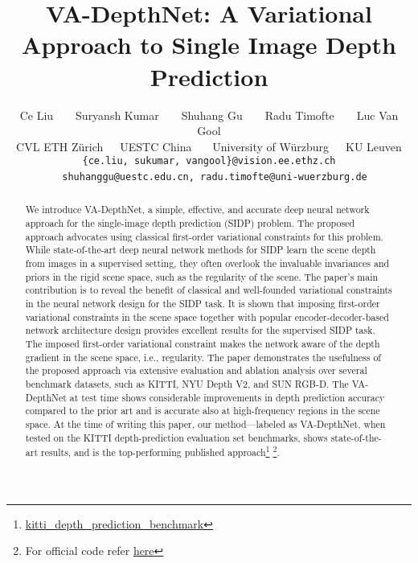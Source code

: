 \documentclass{article} \usepackage{iclr2023_conference, times}
\title{VA-DepthNet: A Variational Approach to Single Image Depth Prediction}
\author{Ce Liu~~~~Suryansh Kumar~~~~Shuhang Gu~~~~Radu Timofte~~~~Luc Van Gool \\ 
CVL ETH Z\"urich~~~UESTC China ~~~University of W\"urzburg~~~KU Leuven\\
\texttt{\{ce.liu, sukumar, vangool\}@vision.ee.ethz.ch}\\ ~~\texttt{shuhanggu@uestc.edu.cn, radu.timofte@uni-wuerzburg.de}
}
\begin{document}
\maketitle






\begin{abstract}
We introduce VA-DepthNet, a simple, effective, and accurate deep neural network approach for the single-image depth prediction (SIDP) problem. The proposed approach advocates using classical first-order variational constraints for this problem. While state-of-the-art deep neural network methods for SIDP learn the scene depth from images in a supervised setting, they often overlook the invaluable invariances and priors in the rigid scene space, such as the regularity of the scene. The paper's main contribution is to reveal the benefit of classical and well-founded variational constraints in the neural network design for the SIDP task. It is shown that imposing first-order variational constraints in the scene space together with popular encoder-decoder-based network architecture design provides excellent results for the supervised SIDP task. The imposed first-order variational constraint makes the network aware of the depth gradient in the scene space, i.e., regularity. The paper demonstrates the usefulness of the proposed approach via extensive evaluation and ablation analysis over several benchmark datasets, such as KITTI, NYU Depth V2, and SUN RGB-D. The VA-DepthNet at test time shows considerable improvements in depth prediction accuracy compared to the prior art and is accurate also at high-frequency regions in the scene space.  At the time of writing this paper, our method---labeled as VA-DepthNet, when tested on the KITTI depth-prediction evaluation set benchmarks, shows state-of-the-art results, and is the top-performing published approach\footnote{\href{https://www.cvlibs.net/datasets/kitti/eval_depth.php?benchmark=depth\_prediction
}{kitti\_depth\_prediction\_benchmark}} \footnote{For official code refer \href{https://github.com/cnexah/VA-DepthNet}{here}}. 
\end{abstract}
\end{document}
